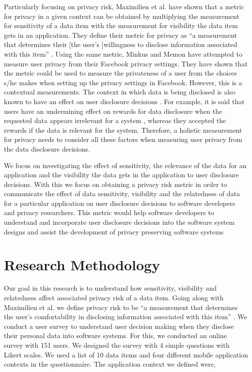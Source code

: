 \documentclass[10pt]{article}
\begin{document}
Particularly focusing on privacy risk, Maximilien et al. \cite {maximilien2009privacy} have shown that a metric for privacy in a given context can be obtained by multiplying the measurement for sensitivity of a data item with the measurement for visibility the data item gets in an application. They define their metric for privacy as \enquote{a measurement that determines their [the user's ]willingness to disclose information associated with this item} \cite {maximilien2009privacy}. Using the same metric, Minkus and Memon \cite{minkus2014scale} have attempted to measure user privacy from their Facebook privacy settings. They have shown that the metric could be used to measure the privateness of a user from the choices s/he makes when setting up the privacy settings in Facebook. However, this is a contextual measurements. The context in which data is being disclosed \cite {nissenbaum2009privacy, john2010strangers} is also known to have an effect on user disclosure decisions \cite {knijnenburg2013making}. For example, it is said that users have an undermining effect on rewards for data disclosure when the requested data appears irrelevant for a system \cite {li2010understanding}, whereas they accepted the rewards if the data is relevant for the system. Therefore, a holistic measurement for privacy needs to consider all these factors when measuring user privacy from the data disclosure decisions. 

We focus on investigating the effect of sensitivity, the relevance of the data for an application and the visibility the data gets in the application to user disclosure decisions. With this we focus on obtaining a privacy risk metric in order to communicate the effect of data sensitivity, visibility and the relatedness of data for a particular application on user disclosure decisions to software developers and privacy researchers. This metric would help software developers to understand and incorporate user disclosure decisions into the software system designs and assist the development of privacy preserving software systems


\section {Research Methodology}

Our goal in this research is to understand how sensitivity, visibility and relatedness affect associated privacy risk of a data item. Going along with Maximilien et al. we define privacy risk to be \enquote{a measurement that determines the user's comfortability in disclosing information associated with this item} \cite {maximilien2009privacy}. We conduct a user survey to understand user decision making when they disclose their personal data into software systems. For this, we conducted an online survey with 151 users. We designed the survey with 4 simple questions with Likert scales. We used a list of 10 data items and four different mobile application contexts in the questionnaire. The application context we defined were,
\end{document}
